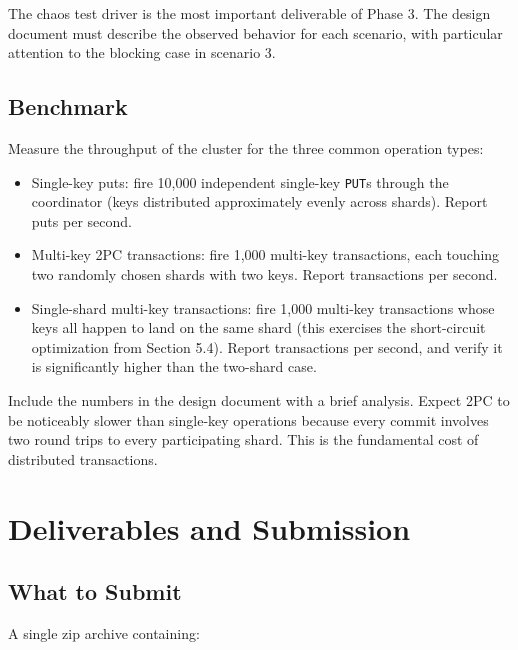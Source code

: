 \documentclass[11pt,a4paper]{article}
\begin{document}
The chaos test driver is the most important deliverable of Phase 3. The design document must describe the observed behavior for each scenario, with particular attention to the blocking case in scenario 3.

\subsection{Benchmark}
Measure the throughput of the cluster for the three common operation types:

\begin{itemize}
\item Single-key puts: fire 10{,}000 independent single-key \texttt{PUT}s through the coordinator (keys distributed approximately evenly across shards). Report puts per second.

\item Multi-key 2PC transactions: fire 1{,}000 multi-key transactions, each touching two randomly chosen shards with two keys. Report transactions per second.

\item Single-shard multi-key transactions: fire 1{,}000 multi-key transactions whose keys all happen to land on the same shard (this exercises the short-circuit optimization from Section 5.4). Report transactions per second, and verify it is significantly higher than the two-shard case.
\end{itemize}

Include the numbers in the design document with a brief analysis. Expect 2PC to be noticeably slower than single-key operations because every commit involves two round trips to every participating shard. This is the fundamental cost of distributed transactions.

\section{Deliverables and Submission}

\subsection{What to Submit}
A single zip archive containing:
\end{document}
